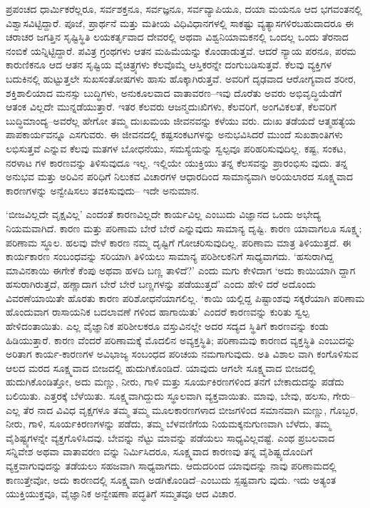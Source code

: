 ಪ್ರಪಂಚದ ಧಾರ್ಮಿಕರೆಲ್ಲರೂ, ಸರ್ವಶಕ್ತನೂ, ಸರ್ವಜ್ಞನೂ, ಸರ್ವವ್ಯಾಪಿಯೂ, ದಯಾ ಮಯನೂ ಆದ ಭಗವಂತನಲ್ಲಿ ವಿಶ್ವಾಸವಿಟ್ಟಿದ್ದಾರೆ. ಪೂಜೆ, ಪ್ರಾರ್ಥನೆ ಮತ್ತು ಮತೀಯ ವಿಧಿವಿಧಾನಗಳಲ್ಲಿ ಸಾಕಷ್ಟು ವ್ಯತ್ಯಾಸಗಳಿರಬಹುದಾದರೂ ಈ ಚರಾಚರ ಜಗತ್ತಿನ ಸೃಷ್ಟಿಸ್ಥಿತಿ ಲಯಕರ್ತೃವಾದ ದೇವರಲ್ಲಿ ಅಥವಾ ವಿಶ್ವನಿಯಾಮಕನಲ್ಲಿ ಒಂದಲ್ಲ ಒಂದು ತೆರನಾದ ನಂಬಿಕೆ ಯನ್ನಿಟ್ಟಿದ್ದಾರೆ. ಪವಿತ್ರ ಗ್ರಂಥಗಳು ಆತನ ಮಹಿಮೆಯನ್ನು ಕೊಂಡಾಡುತ್ತವೆ. ಆದರೆ ನ್ಯಾಯ ಪರನೂ, ಪರಮ ಕಾರುಣಿಕನೂ ಆದ ಆತನ ಸೃಷ್ಟಿಯ ವೈಚಿತ್ರ್ಯಗಳು ಕೆಲವೊಮ್ಮೆ ಆಸ್ತಿಕರನ್ನೇ ದಂಗುಬಡಿಸುತ್ತವೆ. ಕೆಲವು ವ್ಯಕ್ತಿಗಳ ಬದುಕಿನಲ್ಲಿ ಹುಟ್ಟುತ್ತಲೇ ಸುಖಸಂತೋಷಗಳು ಹಾಸು ಹೊಕ್ಕಾಗಿರುತ್ತವೆ. ಅವರಿಗೆ ದೃಢವಾದ ಆರೋಗ್ಯವಾದ ಶರೀರ, ಶಕ್ತಿಶಾಲಿಯಾದ ಮನಸ್ಸು ಬುದ್ಧಿಗಳು, ಅನುಕೂಲವಾದ ವಾತಾವರಣ–ಇವು ದೊರೆತು ಅವರು ಅಭಿವೃದ್ಧಿಯೆಡೆಗೆ ಆತಂಕ ವಿಲ್ಲದೇ ಮುನ್ನಡೆಯುತ್ತಾರೆ. ಇತರ ಕೆಲವರು ಆಜನ್ಮದುಃಖಿಗಳು, ಕೆಲವರಿಗೆ, ಅಂಗವಿಕಲತೆ, ಕೆಲವರಿಗೆ ಬುದ್ಧಿಮಾಂದ್ಯ–ಅವರೆಲ್ಲ ಹೇಗೋ ತಮ್ಮ ದುಃಖಮಯ ಜೀವನವನ್ನು ಕಳೆಯು ವರು. ದುಃಖ ತಡೆಯದೆ ಆತ್ಮಹತ್ಯೆಯ ಪಾಪಕಾರ್ಯವನ್ನೂ ಎಸಗುವರು. ಈ ಜೀವನದಲ್ಲಿ ಕಷ್ಟಸಂಕಟಗಳನ್ನು ಅನುಭವಿಸಿದರೆ ಮುಂದೆ ಸುಖಶಾಂತಿಗಳು ಲಭಿಸುತ್ತವೆ ಎನ್ನುವ ಕೆಲವು ಮತಗಳ ಬೋಧನೆಯು, ಸಮಸ್ಯೆಯನ್ನು ಸ್ವಲ್ಪವೂ ಪರಿಹರಿಸುವುದಿಲ್ಲ. ಕಷ್ಟ, ಸಂಕಟ, ನರಳಾಟ ಗಳ ಕಾರಣವನ್ನು ತಿಳಿಸುವುದೂ ಇಲ್ಲ. ಇಲ್ಲಿಯೇ ಯುಕ್ತಿಯು ತನ್ನ ಕೆಲಸವನ್ನು ಪ್ರಾರಂಭಿಸು ವುದು. ತನ್ನ ಅನುಭವ ಮತ್ತು ಅರಿವಿನ ಪರಿಧಿಗೆ ನಿಲುಕವ ವಿಚಾರಗಳ ಆಧಾರದಿಂದ ಸಾಮಾನ್ಯವಾಗಿ ಅರಿಯಲಾರದ ಸೂಕ್ಷ್ಮವಾದ ಕಾರಣಗಳನ್ನು ಅನ್ವೇಷಿಸಲು ತವಕಿಸುವುದು– ಇದೇ ಅನುಮಾನ.

‘ಬೀಜವಿಲ್ಲದೇ ವೃಕ್ಷವಿಲ್ಲ’ ಎಂದಂತೆ ಕಾರಣವಿಲ್ಲದೇ ಕಾರ್ಯವಿಲ್ಲ ಎಂಬುದು ವಿಜ್ಞಾನದ ಒಂದು ಅಭೇದ್ಯ ನಿಯಮವಾಗಿದೆ. ಕಾರಣ ಮತ್ತು ಪರಿಣಾಮ ಬೇರೆ ಬೇರೆ ಎನ್ನುವುದು ಸಾಮಾನ್ಯ ದೃಷ್ಟಿ. ಕಾರಣ ಯಾವಾಗಲೂ ಸೂಕ್ಷ್ಮ; ಪರಿಣಾಮ ಸ್ಥೂಲ. ಹಲವು ವೇಳೆ ಕಾರಣ ನಮ್ಮ ದೃಷ್ಟಿಗೆ ಗೋಚರಿಸುವುದಿಲ್ಲ. ಪರಿಣಾಮ ಮಾತ್ರ ತಿಳಿಯುತ್ತದೆ. ಈ ಕಾರ್ಯಕಾರಣ ಸಂಬಂಧವನ್ನು ಸರಿಯಾಗಿ ತಿಳಿಯಲು ಸಾಮಾನ್ಯ ಪರಿಶೀಲಕನಿಗೆ ಸಾಧ್ಯವಾಗದು. ‘ಹಸುರಾಗಿದ್ದ ಮಾವಿನಕಾಯಿ ಈಗೇಕೆ ಕೆಂಪು ಅಥವಾ ಹಳದಿ ಬಣ್ಣ ತಾಳಿದೆ?’ ಎಂದು ಮಗು ಕೇಳಿದಾಗ ‘ಅದು ಕಾಯಿಯಾಗಿ ದ್ದಾಗ ಹಸುರಾಗಿರುತ್ತದೆ, ಹಣ್ಣಾದಾಗ ಬೇರೆ ಬೇರೆ ಬಣ್ಣಗಳನ್ನು ಪಡೆಯುತ್ತದೆ’ ಎಂದು ಹೇಳಿ ದರೆ ಅದೊಂದು ವಿವರಣೆಯಾಯಿತೇ ಹೊರತು ಕಾರಣ ಪರಿಶೋಧನೆಯಾಗಲಿಲ್ಲ. ‘ಕಾಯಿ ಯಲ್ಲಿದ್ದ ಪಿಷ್ಟಾಂಶವು ಸಕ್ಕರೆಯಾಗಿ ಪರಿಣಾಮ ಹೊಂದುವಾಗ ರಾಸಾಯನಿಕ ಬದಲಾವಣೆ ಗಳಿಂದ ಹಾಗಾಯಿತು’ ಎಂದರೆ ಕಾರಣವನ್ನು ಕುರಿತು ಸ್ವಲ್ಪ ಹೇಳಿದಂತಾಯಿತು. ಎಲ್ಲ ವೈಜ್ಞಾನಿಕ ಪರಿಶೀಲಕರೂ ವಸ್ತುವಿನಲ್ಲೇ ಅದರ ಸದ್ಯದ ಸ್ಥಿತಿಗೆ ಕಾರಣವನ್ನು ಕಂಡು ಹಿಡಿಯುತ್ತಾರೆ. ಕಾರಣ ವೆಂದರೆ ಪರಿಣಾಮಕ್ಕೆ ಮೊದಲಿನ ಅವ್ಯಕ್ತಸ್ಥಿತಿ; ಪರಿಣಾಮವು ಕಾರಣದ ವ್ಯಕ್ತಸ್ಥಿತಿ ಎಂಬುದನ್ನು ಅರಿತಾಗ ಕಾರ್ಯ-ಕಾರಣಗಳ ಅವಿಭಾಜ್ಯ ಸಂಬಂಧದ ಪರಿಚಯ ನಮಗಾಗುವುದು. ಅತಿ ವಿಶಾಲ ವಾಗಿ ಕಂಗೊಳಿಸುವ ಆಲದ ಮರದ ಸೂಕ್ಷ್ಮವಾದ ಬೀಜದಲ್ಲಿ ಹುದುಗಿಕೊಂಡಿದೆ. ಯಾವುದು ಆಗಲೇ ಸೂಕ್ಷ್ಮವಾದ ಬೀಜದಲ್ಲಿ ಹುದುಗಿಕೊಂಡಿತ್ತೋ, ಅದು ಮಣ್ಣು, ನೀರು, ಗಾಳಿ ಮತ್ತು ಸೂರ್ಯಕಿರಣಗಳಿಂದ ತನಗೆ ಬೇಕಾದುದನ್ನು ಪಡೆದು ಬಲಿಯಿತು. ಎತ್ತರಕ್ಕೆ ಬೆಳೆಯಿತು. ಸೂಕ್ಷ್ಮವಾಗಿದ್ದುದು ಸ್ಥೂಲವಾಗಿ ವ್ಯಕ್ತವಾಯಿತು. ಮಾವು, ಬೇವು, ಹಲಸು, ಗೇರು–ಎಲ್ಲ ತೆರ ನಾದ ವಿವಿಧ ವೃಕ್ಷಗಳೂ ತಮ್ಮ ತಮ್ಮ ಮೂಲಕಾರಣಗಳಾದ ಬೀಜಗಳಿಂದ ಸಮಾನವಾಗಿ ಮಣ್ಣು, ಗೊಬ್ಬರ, ನೀರು, ಗಾಳಿ, ಸೂರ್ಯಕಿರಣಗಳನ್ನು ಪಡೆದು, ತಮ್ಮ ಬೆಳವಣಿಗೆಯ ನಿಯಮಕ್ಕನುಗುಣವಾಗಿ ಬೆಳೆದು, ತಮ್ಮ ವೈಶಿಷ್ಟ್ಯಗಳನ್ನೇ ವ್ಯಕ್ತಗೊಳಿಸಿದವು. ಬೇವನ್ನು ನೆಟ್ಟು ಮಾವನ್ನು ಪಡೆಯಲು ಸಾಧ್ಯವಿಲ್ಲವಷ್ಟೆ. ಎಂಥ ಪ್ರಬಲವಾದ ಸನ್ನಿವೇಶ ಅಥವಾ ವಾತಾವರಣ ವನ್ನು ನಿರ್ಮಿಸಿದರೂ, ಸೂಕ್ಷ್ಮವಾದ ಕಾರಣವು ತನ್ನ ವೈಶಿಷ್ಟ್ಯದೊಂದಿಗೆ ವ್ಯಕ್ತವಾಗುವುದನ್ನು ತಡೆಯಲು ಸಹಜವಾಗಿ ಸಾಧ್ಯವಾಗದು. ಆದುದರಿಂದ ಯಾವುದನ್ನು ನಾವು ಪರಿಣಾಮದಲ್ಲಿ ಕಾಣುತ್ತೇವೋ, ಅದು ಕಾರಣದಲ್ಲಿ ಸೂಕ್ಷ್ಮವಾಗಿ ಅಡಗಿಕೊಂಡಿದೆ–ಎಂಬುದು ಸ್ಪಷ್ಟವಾಗು ವುದು. ಇದು ಅತ್ಯಂತ ಯುಕ್ತಿಯುಕ್ತವೂ, ವೈಜ್ಞಾನಿಕ ಅನ್ವೇಷಣಾ ಪದ್ಧತಿಗೆ ಸಮ್ಮತವೂ ಆದ ವಿಚಾರ.


